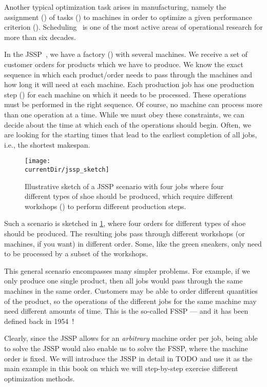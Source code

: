 %
%
\label{sec:jsspExample}%
%
Another typical optimization task arises in manufacturing, namely the assignment () of tasks () to machines in order to optimize a given performance criterion ().
Scheduling~\cite{P2016STAAS,PS2009FYOSASOM} is one of the most active areas of operational research for more than  six decades.

In the \acrfull{JSSP}~\cite{CGLL1995STAIA,GLLRK1979OAAIDSASAS,LLRKS1993SASAAC,L1982RRITTOMS,T1993BFBSP,BDP1996TJSSPCANST}, we have a factory () with several machines.
We receive a set of customer orders for products which we have to produce.
We know the exact sequence in which each product/order needs to pass through the machines and how long it will need at each machine.
Each production job has one production step () for each machine on which it needs to be processed.
These operations must be performed in the right sequence.
Of course, no machine can process more than one operation at a time.
While we must obey these constraints, we can decide about the time at which each of the operations should begin.
Often, we are looking for the starting times that lead to the earliest completion of all jobs, i.e., the shortest makespan.

\begin{figure}%
\centering%
\texttt{[image: \\currentDir/jssp\_sketch]}%
\caption{Illustrative sketch of a \acrfull{JSSP} scenario with four jobs where four different types of shoe should be produced, which require different workshops () to perform different production steps.}%
\label{fig:jssp_sketch}%
\end{figure}%
%
Such a scenario is sketched in \cref{fig:jssp_sketch}, where four orders for different types of shoe should be produced.
The resulting jobs pass through different workshops (or machines, if you want) in different order.
Some, like the green sneakers, only need to be processed by a subset of the workshops.

This general scenario encompasses many simpler problems.
For example, if we only produce one single product, then all jobs would pass through the same machines in the same order.
Customers may be able to order different quantities of the product, so the operations of the different jobs for the same machine may need different amounts of time.
This is the so-called \acrfull{FSSP} --- and it has been defined back in 1954~\cite{J1954OTATSPSWSTI}!

Clearly, since the \gls{JSSP} allows for an \emph{arbitrary} machine order per job, being able to solve the \gls{JSSP} would also enable us to solve the FSSP, where the machine order is fixed.
We will introduce the \gls{JSSP} in detail in TODO and use it as the main example in this book on which we will step-by-step exercise different optimization methods.%
\endhsection%
%
